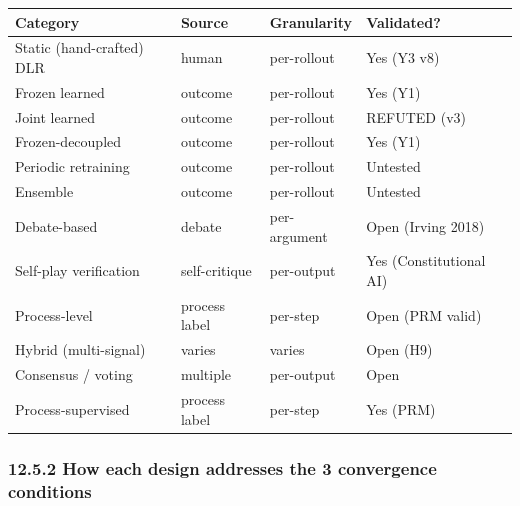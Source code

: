 \documentclass[
]{article}
\newcounter{none} %
\begin{document}
{\def\LTcaptype{none} %
\begin{longtable}[]{@{}
  >{\raggedright\arraybackslash}p{}
  >{\raggedright\arraybackslash}p{}
  >{\raggedright\arraybackslash}p{}
  >{\raggedright\arraybackslash}p{}@{}}
\toprule\noalign{}
\begin{minipage}[b]{\linewidth}\raggedright
Category
\end{minipage} & \begin{minipage}[b]{\linewidth}\raggedright
Source
\end{minipage} & \begin{minipage}[b]{\linewidth}\raggedright
Granularity
\end{minipage} & \begin{minipage}[b]{\linewidth}\raggedright
Validated?
\end{minipage} \\
\midrule\noalign{}
\endhead
\bottomrule\noalign{}
\endlastfoot
Static (hand-crafted) DLR & human & per-rollout & Yes (Y3 v8) \\
Frozen learned & outcome & per-rollout & Yes (Y1) \\
Joint learned & outcome & per-rollout & REFUTED (v3) \\
Frozen-decoupled & outcome & per-rollout & Yes (Y1) \\
Periodic retraining & outcome & per-rollout & Untested \\
Ensemble & outcome & per-rollout & Untested \\
Debate-based & debate & per-argument & Open (Irving 2018) \\
Self-play verification & self-critique & per-output & Yes
(Constitutional AI) \\
Process-level & process label & per-step & Open (PRM valid) \\
Hybrid (multi-signal) & varies & varies & Open (H9) \\
Consensus / voting & multiple & per-output & Open \\
Process-supervised & process label & per-step & Yes (PRM) \\
\end{longtable}
}

\subsubsection{12.5.2 How each design addresses the 3 convergence
conditions}\label{how-each-design-addresses-the-3-convergence-conditions}
\end{document}
